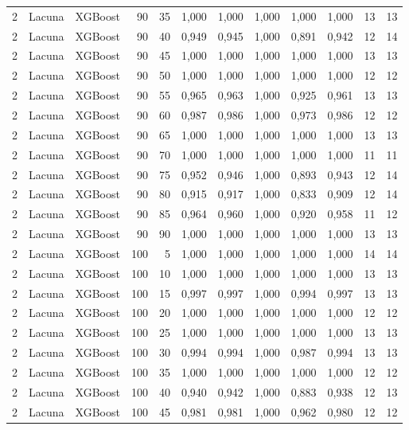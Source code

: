 \begin{longtable}{@{}rllrrrrrrrrr@{}}
2 & Lacuna & XGBoost & 90 & 35 & 1,000 & 1,000 & 1,000 & 1,000 & 1,000 & 13 & 13 \\
2 & Lacuna & XGBoost & 90 & 40 & 0,949 & 0,945 & 1,000 & 0,891 & 0,942 & 12 & 14 \\
2 & Lacuna & XGBoost & 90 & 45 & 1,000 & 1,000 & 1,000 & 1,000 & 1,000 & 13 & 13 \\
2 & Lacuna & XGBoost & 90 & 50 & 1,000 & 1,000 & 1,000 & 1,000 & 1,000 & 12 & 12 \\
2 & Lacuna & XGBoost & 90 & 55 & 0,965 & 0,963 & 1,000 & 0,925 & 0,961 & 13 & 13 \\
2 & Lacuna & XGBoost & 90 & 60 & 0,987 & 0,986 & 1,000 & 0,973 & 0,986 & 12 & 12 \\
2 & Lacuna & XGBoost & 90 & 65 & 1,000 & 1,000 & 1,000 & 1,000 & 1,000 & 13 & 13 \\
2 & Lacuna & XGBoost & 90 & 70 & 1,000 & 1,000 & 1,000 & 1,000 & 1,000 & 11 & 11 \\
2 & Lacuna & XGBoost & 90 & 75 & 0,952 & 0,946 & 1,000 & 0,893 & 0,943 & 12 & 14 \\
2 & Lacuna & XGBoost & 90 & 80 & 0,915 & 0,917 & 1,000 & 0,833 & 0,909 & 12 & 14 \\
2 & Lacuna & XGBoost & 90 & 85 & 0,964 & 0,960 & 1,000 & 0,920 & 0,958 & 11 & 12 \\
2 & Lacuna & XGBoost & 90 & 90 & 1,000 & 1,000 & 1,000 & 1,000 & 1,000 & 13 & 13 \\
2 & Lacuna & XGBoost & 100 & 5 & 1,000 & 1,000 & 1,000 & 1,000 & 1,000 & 14 & 14 \\
2 & Lacuna & XGBoost & 100 & 10 & 1,000 & 1,000 & 1,000 & 1,000 & 1,000 & 13 & 13 \\
2 & Lacuna & XGBoost & 100 & 15 & 0,997 & 0,997 & 1,000 & 0,994 & 0,997 & 13 & 13 \\
2 & Lacuna & XGBoost & 100 & 20 & 1,000 & 1,000 & 1,000 & 1,000 & 1,000 & 12 & 12 \\
2 & Lacuna & XGBoost & 100 & 25 & 1,000 & 1,000 & 1,000 & 1,000 & 1,000 & 13 & 13 \\
2 & Lacuna & XGBoost & 100 & 30 & 0,994 & 0,994 & 1,000 & 0,987 & 0,994 & 13 & 13 \\
2 & Lacuna & XGBoost & 100 & 35 & 1,000 & 1,000 & 1,000 & 1,000 & 1,000 & 12 & 12 \\
2 & Lacuna & XGBoost & 100 & 40 & 0,940 & 0,942 & 1,000 & 0,883 & 0,938 & 12 & 13 \\
2 & Lacuna & XGBoost & 100 & 45 & 0,981 & 0,981 & 1,000 & 0,962 & 0,980 & 12 & 12 \\

\end{longtable}
